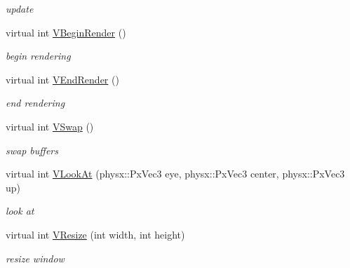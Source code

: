 \begin{DoxyCompactItemize}
\begin{DoxyCompactList}\small\item\em update \item\end{DoxyCompactList}\item 
\hypertarget{classPlatform_1_1Render_ab638442d074b2b3843281de5ed3a2115}{
virtual int \hyperlink{classPlatform_1_1Render_ab638442d074b2b3843281de5ed3a2115}{VBeginRender} ()}
\label{classPlatform_1_1Render_ab638442d074b2b3843281de5ed3a2115}

\begin{DoxyCompactList}\small\item\em begin rendering \item\end{DoxyCompactList}\item 
\hypertarget{classPlatform_1_1Render_a259ac125e556c6ee0cf90c5594c6b73c}{
virtual int \hyperlink{classPlatform_1_1Render_a259ac125e556c6ee0cf90c5594c6b73c}{VEndRender} ()}
\label{classPlatform_1_1Render_a259ac125e556c6ee0cf90c5594c6b73c}

\begin{DoxyCompactList}\small\item\em end rendering \item\end{DoxyCompactList}\item 
\hypertarget{classPlatform_1_1Render_a8d8e34bc46f69426259e3bac91cba516}{
virtual int \hyperlink{classPlatform_1_1Render_a8d8e34bc46f69426259e3bac91cba516}{VSwap} ()}
\label{classPlatform_1_1Render_a8d8e34bc46f69426259e3bac91cba516}

\begin{DoxyCompactList}\small\item\em swap buffers \item\end{DoxyCompactList}\item 
\hypertarget{classPlatform_1_1Render_a5ccdcbd11e9631b8df2aefa94fde5666}{
virtual int \hyperlink{classPlatform_1_1Render_a5ccdcbd11e9631b8df2aefa94fde5666}{VLookAt} (physx::PxVec3 eye, physx::PxVec3 center, physx::PxVec3 up)}
\label{classPlatform_1_1Render_a5ccdcbd11e9631b8df2aefa94fde5666}

\begin{DoxyCompactList}\small\item\em look at \item\end{DoxyCompactList}\item 
\hypertarget{classPlatform_1_1Render_a3758022f59da9a74f0adea66b13aae5d}{
virtual int \hyperlink{classPlatform_1_1Render_a3758022f59da9a74f0adea66b13aae5d}{VResize} (int width, int height)}
\label{classPlatform_1_1Render_a3758022f59da9a74f0adea66b13aae5d}

\begin{DoxyCompactList}\small\item\em resize window \item\end{DoxyCompactList}\end{DoxyCompactItemize}


